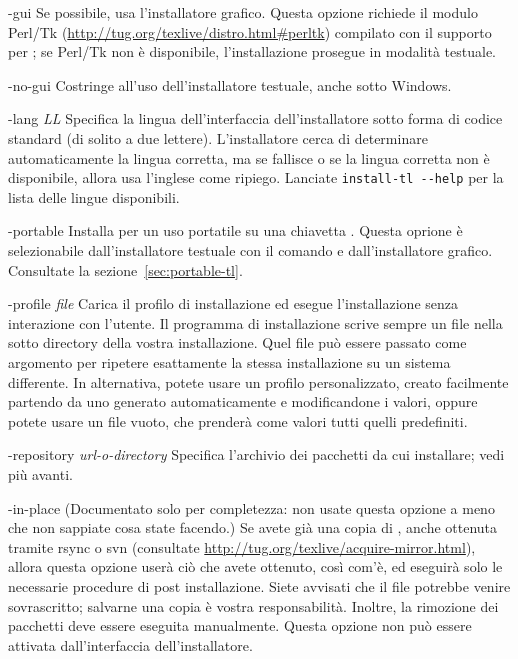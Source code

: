 \documentclass{article}
\begin{document}
\begin{ttdescription}
\item[-gui] Se possibile, usa l'installatore grafico. Questa opzione
  richiede il modulo Perl/Tk
  (\url{http://tug.org/texlive/distro.html#perltk}) compilato con il
  supporto per ; se Perl/Tk non è disponibile, l'installazione
  prosegue in modalità testuale.

\item[-no-gui] Costringe all'uso dell'installatore testuale, anche sotto
  Windows.

\item[-lang {\sl LL}] Specifica la lingua dell'interfaccia
  dell'installatore sotto forma di codice standard (di solito a due
  lettere). L'installatore cerca di determinare automaticamente la lingua
  corretta, ma se fallisce o se la lingua corretta non è disponibile,
  allora usa l'inglese come ripiego. Lanciate \verb|install-tl --help|
  per la lista delle lingue disponibili.

\item[-portable] Installa per un uso portatile su una chiavetta \USB{}.
  Questa oprione è selezionabile dall'installatore testuale con il comando
   e dall'installatore grafico. Consultate la
  sezione~\ref{sec:portable-tl}.

\item[-profile {\sl file}] Carica il profilo di installazione  ed
  esegue l'installazione senza interazione con l'utente. Il programma di
  installazione scrive sempre un file  nella sotto
  directory  della vostra installazione. Quel file può essere
  passato come argomento per ripetere esattamente la stessa installazione su
  un sistema differente. In alternativa, potete usare un profilo
  personalizzato, creato facilmente partendo da uno generato automaticamente
  e modificandone i valori, oppure potete usare un file vuoto, che prenderà
  come valori tutti quelli predefiniti.

\item [-repository {\sl url-o-directory}] Specifica l'archivio dei
  pacchetti da cui installare; vedi più avanti.

\item[-in-place] (Documentato solo per completezza: non usate questa
  opzione a meno che non sappiate cosa state facendo.) Se avete già una
  copia di \TL{}, anche ottenuta tramite rsync o svn (consultate
  \url{http://tug.org/texlive/acquire-mirror.html}),
  allora questa opzione userà ciò che avete ottenuto, così com'è, ed
  eseguirà solo le necessarie procedure di post installazione. Siete
  avvisati che il file  potrebbe venire
  sovrascritto; salvarne una copia è vostra responsabilità. Inoltre, la
  rimozione dei pacchetti deve essere eseguita manualmente. Questa
  opzione non può essere attivata dall'interfaccia dell'installatore.
\end{ttdescription}
\end{document}
